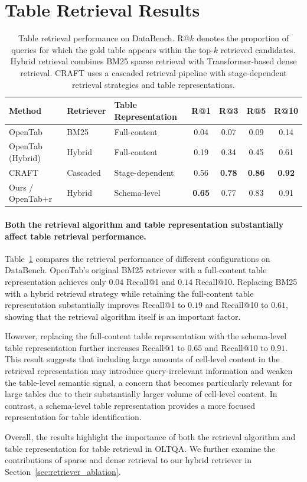 \section{Table Retrieval Results}

\begin{table}[t]
\centering
\caption{Table retrieval performance on DataBench.
R@$k$ denotes the proportion of queries for which the gold table appears within the top-$k$ retrieved candidates.
Hybrid retrieval combines BM25 sparse retrieval with Transformer-based dense retrieval.
CRAFT uses a cascaded retrieval pipeline with stage-dependent retrieval strategies and table representations.}
\label{tab:retrieval_results}
\begin{tabular}{lllcccc}
\toprule
\textbf{Method} &
\textbf{Retriever} &
\textbf{Table Representation} &
\textbf{R@1} &
\textbf{R@3} &
\textbf{R@5} &
\textbf{R@10} \\
\midrule
OpenTab~\cite{opentab}
& BM25
& Full-content
& 0.04 & 0.07 & 0.09 & 0.14 \\

OpenTab (Hybrid)
& Hybrid
& Full-content
& 0.19 & 0.34 & 0.45 & 0.61 \\

CRAFT~\cite{craft}
& Cascaded
& Stage-dependent
& 0.56 & \textbf{0.78} & \textbf{0.86} & \textbf{0.92} \\
\midrule
Ours / OpenTab+r
& Hybrid
& Schema-level
& \textbf{0.65} & 0.77 & 0.83 & 0.91 \\
\bottomrule
\end{tabular}
\end{table}

\paragraph{Both the retrieval algorithm and table representation substantially affect table retrieval performance.}
Table~\ref{tab:retrieval_results} compares the retrieval performance of different configurations on DataBench.
OpenTab's original BM25 retriever with a full-content table representation achieves only $0.04$ Recall@1 and $0.14$ Recall@10.
Replacing BM25 with a hybrid retrieval strategy while retaining the full-content table representation substantially improves Recall@1 to $0.19$ and Recall@10 to $0.61$, showing that the retrieval algorithm itself is an important factor.

However, replacing the full-content table representation with the schema-level table representation further increases Recall@1 to $0.65$ and Recall@10 to $0.91$.
This result suggests that including large amounts of cell-level content in the retrieval representation may introduce query-irrelevant information and weaken the table-level semantic signal, a concern that becomes particularly relevant for large tables due to their substantially larger volume of cell-level content.
In contrast, a schema-level table representation provides a more focused representation for table identification.

Overall, the results highlight the importance of both the retrieval algorithm and table representation for table retrieval in OLTQA.
We further examine the contributions of sparse and dense retrieval to our hybrid retriever in Section~\ref{sec:retriever_ablation}.